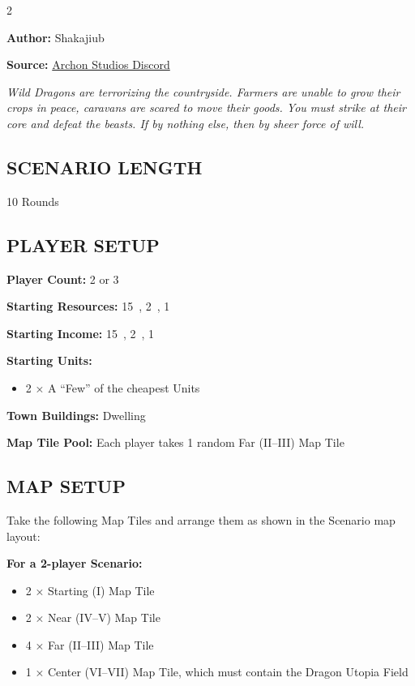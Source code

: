 
\begin{multicols*}{2}

\textbf{Author:} Shakajiub

\textbf{Source:} \href{https://discord.com/channels/740870068178649108/1237891632448278618}{Archon Studios Discord}

\textit{Wild Dragons are terrorizing the countryside.
Farmers are unable to grow their crops in peace, caravans are scared to move their goods.
You must strike at their core and defeat the beasts.
If by nothing else, then by sheer force of will.}

\subsection*{\MakeUppercase{Scenario Length}}
10 Rounds

\subsection*{\MakeUppercase{Player Setup}}
\textbf{Player Count:} 2 or 3

\textbf{Starting Resources:} 15~, 2~, 1~

\textbf{Starting Income:} 15~, 2~, 1~

\textbf{Starting Units:}
\begin{itemize}
  \item 2 × A ``Few'' of the cheapest  Units
\end{itemize}

\textbf{Town Buildings:}  Dwelling

\textbf{Map Tile Pool:} Each player takes 1 random Far (II--III) Map Tile

\subsection*{\MakeUppercase{Map Setup}}
Take the following Map Tiles and arrange them as shown in the Scenario map layout:

\textbf{For a 2-player Scenario:}
\begin{itemize}
  \item 2 × Starting (I) Map Tile
  \item 2 × Near (IV--V) Map Tile
  \item 4 × Far (II--III) Map Tile
  \item 1 × Center (VI--VII) Map Tile, which must contain the Dragon Utopia Field
\end{itemize}


\end{multicols*}
